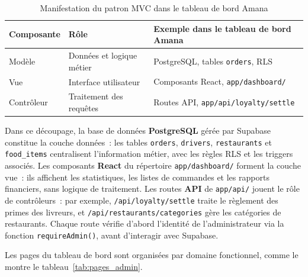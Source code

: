 \documentclass[12pt,fleqn,a4paper]{report}
\begin{document}
\begin{justify}
\begin{table}[H]
\centering
\renewcommand{\arraystretch}{1.4}
\begin{tabular}{|l|l|l|}
\hline
\textbf{Composante} & \textbf{Rôle} & \textbf{Exemple dans le tableau de bord Amana} \\
\hline
Modèle & Données et logique métier & PostgreSQL, tables \texttt{orders}, RLS \\
\hline
Vue & Interface utilisateur & Composants React, \texttt{app/dashboard/} \\
\hline
Contrôleur & Traitement des requêtes & Routes API, \texttt{app/api/loyalty/settle} \\
\hline
\end{tabular}
\caption{Manifestation du patron MVC dans le tableau de bord Amana}
\end{table}

Dans ce découpage, la base de données \textbf{PostgreSQL} gérée par Supabase constitue la couche données~: les tables \texttt{orders}, \texttt{drivers}, \texttt{restaurants} et \texttt{food\_items} centralisent l'information métier, avec les règles RLS et les triggers associés. Les composants \textbf{React} du répertoire \texttt{app/dashboard/} forment la couche vue~: ils affichent les statistiques, les listes de commandes et les rapports financiers, sans logique de traitement. Les routes \textbf{API} de \texttt{app/api/} jouent le rôle de contrôleurs~: par exemple, \texttt{/api/loyalty/settle} traite le règlement des primes des livreurs, et \texttt{/api/restaurants/categories} gère les catégories de restaurants. Chaque route vérifie d'abord l'identité de l'administrateur via la fonction \texttt{requireAdmin()}, avant d'interagir avec Supabase.

Les pages du tableau de bord sont organisées par domaine fonctionnel, comme le montre le tableau~\ref{tab:pages_admin}.


\end{justify}
\end{document}
